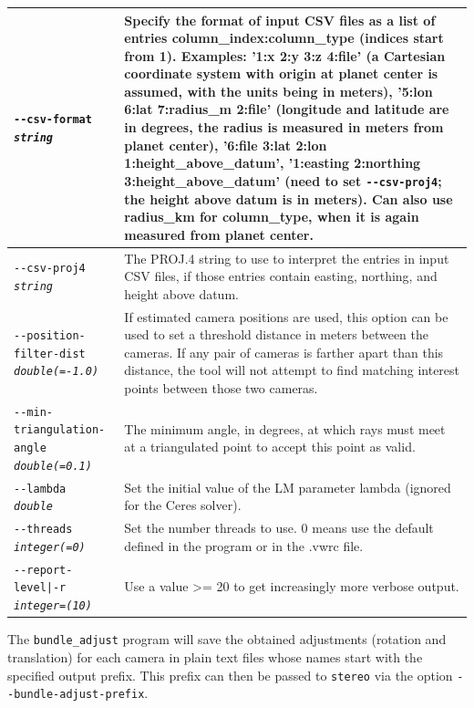 \begin{longtable}{|l|p{7.5cm}|}
\texttt{-\/-csv-format \textit{string}} & Specify the format of input
CSV files as a list of entries column\_index:column\_type (indices start
from 1). Examples: '1:x 2:y 3:z 4:file' (a Cartesian coordinate system with
origin at planet center is assumed, with the units being in meters),
'5:lon 6:lat 7:radius\_m 2:file' (longitude and latitude are in degrees, the
radius is measured in meters from planet center), '6:file 3:lat 2:lon
1:height\_above\_datum', '1:easting 2:northing 3:height\_above\_datum'
(need to set \texttt{-\/-csv-proj4}; the height above datum is in
meters). Can also use radius\_km for column\_type, when it is again
measured from planet center.\\ \hline

\texttt{-\/-csv-proj4 \textit{string}} & The PROJ.4 string to use to
interpret the entries in input CSV files, if those entries contain
easting, northing, and height above datum. \\ \hline

\texttt{-\/-position-filter-dist \textit{double(=-1.0)}} &
If estimated camera positions are used, this option can be used to set a threshold distance in meters
between the cameras.  If any pair of cameras is farther apart than this distance, the tool will not
attempt to find matching interest points between those two cameras.
\\ \hline

\texttt{-\/-min-triangulation-angle \textit{double(=0.1)}} &
The minimum angle, in degrees, at which rays must meet at a triangulated point to accept this point as valid.
\\ \hline

\texttt{-\/-lambda \textit{double}} & Set the initial value of the LM parameter
lambda (ignored for the Ceres solver).\\ \hline

\texttt{-\/-threads \textit{integer(=0)}} & Set the number threads to use. 0 means use the default defined in the program or in the .vwrc file.\\ \hline

\texttt{-\/-report-level|-r \textit{integer=(10)}} & Use a value >= 20 to
get increasingly more verbose output. \\ \hline
\end{longtable}

The \texttt{bundle\_adjust} program will save the obtained adjustments
(rotation and translation) for each camera in plain text files whose
names start with the specified output prefix. This prefix can then be
passed to \texttt{stereo} via the option
\texttt{-\/-bundle-adjust-prefix}.

